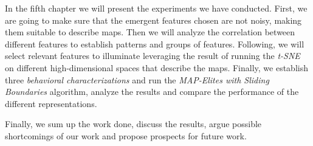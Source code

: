In the fifth chapter we will present the experiments we have conducted. First, we are going to make sure that the emergent features chosen are not noisy, making them suitable to describe maps. Then we will analyze the correlation between different features to establish patterns and groups of features. Following, we will select relevant features to illuminate leveraging the result of running the \textit{t-SNE} on different high-dimensional spaces that describe the maps. Finally, we establish three \textit{behavioral characterizations} and run the \textit{MAP-Elites with Sliding Boundaries} algorithm, analyze the results and compare the performance of the different representations.

Finally, we sum up the work done, discuss the results, argue possible shortcomings of our work and propose prospects for future work.
